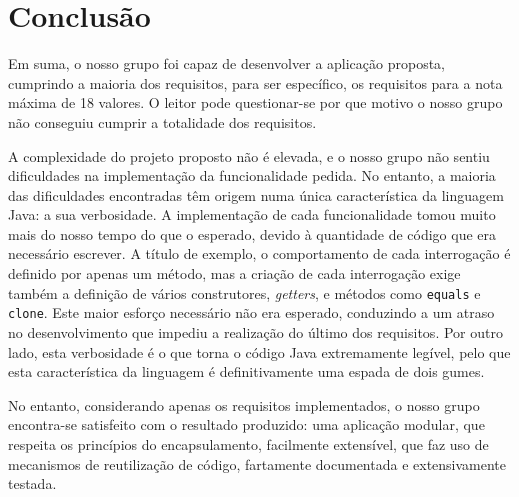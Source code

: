 \documentclass[12pt, a4paper]{article}
\begin{document}
\section{Conclusão}

Em suma, o nosso grupo foi capaz de desenvolver a aplicação proposta, cumprindo a maioria dos
requisitos, para ser específico, os requisitos para a nota máxima de 18 valores. O leitor pode
questionar-se por que motivo o nosso grupo não conseguiu cumprir a totalidade dos requisitos.

A complexidade do projeto proposto não é elevada, e o nosso grupo não sentiu dificuldades na
implementação da funcionalidade pedida. No entanto, a maioria das dificuldades encontradas têm
origem numa única característica da linguagem Java: a sua verbosidade. A implementação de cada
funcionalidade tomou muito mais do nosso tempo do que o esperado, devido à quantidade de código que
era necessário escrever. A título de exemplo, o comportamento de cada interrogação é definido por
apenas um método, mas a criação de cada interrogação exige também a definição de vários
construtores, \emph{getters}, e métodos como \texttt{equals} e \texttt{clone}. Este maior esforço
necessário não era esperado, conduzindo a um atraso no desenvolvimento que impediu a realização do
último dos requisitos. Por outro lado, esta verbosidade é o que torna o código Java extremamente
legível, pelo que esta característica da linguagem é definitivamente uma espada de dois gumes.

No entanto, considerando apenas os requisitos implementados, o nosso grupo encontra-se
satisfeito com o resultado produzido: uma aplicação modular, que respeita os princípios do
encapsulamento, facilmente extensível, que faz uso de mecanismos de reutilização de código,
fartamente documentada e extensivamente testada.


\end{document}
